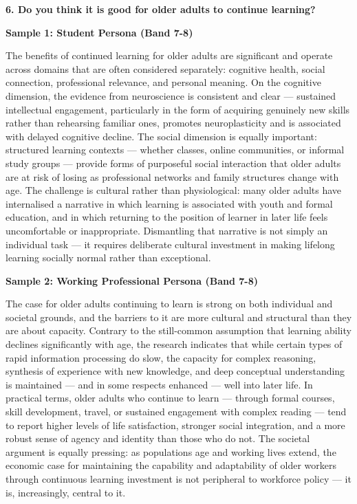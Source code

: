 \separator

\begin{ieltsquestion}
\textbf{6. Do you think it is good for older adults to continue learning?}
\end{ieltsquestion}
\textbf{Sample 1: Student Persona (Band 7-8)}

The benefits of continued learning for older adults are significant and operate across domains that are often considered separately: cognitive health, social connection, professional relevance, and personal meaning. On the cognitive dimension, the evidence from neuroscience is consistent and clear — sustained intellectual engagement, particularly in the form of acquiring genuinely new skills rather than rehearsing familiar ones, promotes neuroplasticity and is associated with delayed cognitive decline. The social dimension is equally important: structured learning contexts — whether classes, online communities, or informal study groups — provide forms of purposeful social interaction that older adults are at risk of losing as professional networks and family structures change with age. The challenge is cultural rather than physiological: many older adults have internalised a narrative in which learning is associated with youth and formal education, and in which returning to the position of learner in later life feels uncomfortable or inappropriate. Dismantling that narrative is not simply an individual task — it requires deliberate cultural investment in making lifelong learning socially normal rather than exceptional.

\textbf{Sample 2: Working Professional Persona (Band 7-8)}

The case for older adults continuing to learn is strong on both individual and societal grounds, and the barriers to it are more cultural and structural than they are about capacity. Contrary to the still-common assumption that learning ability declines significantly with age, the research indicates that while certain types of rapid information processing do slow, the capacity for complex reasoning, synthesis of experience with new knowledge, and deep conceptual understanding is maintained — and in some respects enhanced — well into later life. In practical terms, older adults who continue to learn — through formal courses, skill development, travel, or sustained engagement with complex reading — tend to report higher levels of life satisfaction, stronger social integration, and a more robust sense of agency and identity than those who do not. The societal argument is equally pressing: as populations age and working lives extend, the economic case for maintaining the capability and adaptability of older workers through continuous learning investment is not peripheral to workforce policy — it is, increasingly, central to it.

